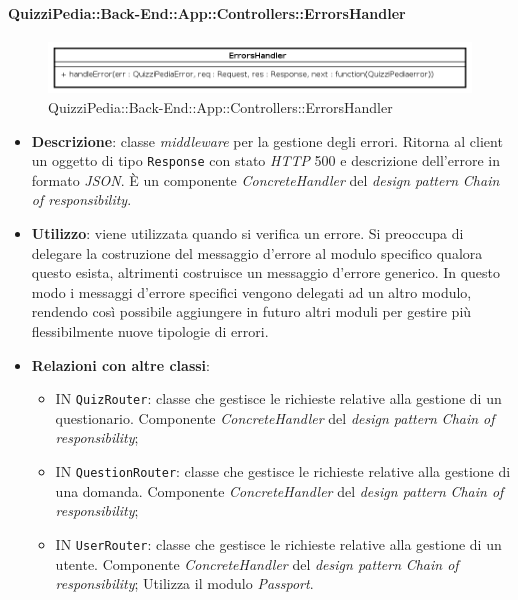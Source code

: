 \paragraph{QuizziPedia::Back-End::App::Controllers::ErrorsHandler}
\begin{figure}[ht]
	\centering
	\includegraphics[scale=0.45]{UML/Classi/Back-End/QuizziPedia_Back-End_App_Controllers_ErrorsHandler.png}
	\caption{QuizziPedia::Back-End::App::Controllers::ErrorsHandler}
\end{figure}
\FloatBarrier


\begin{itemize}
	\item \textbf{Descrizione}:
	classe \textit{middleware} per la gestione degli errori. Ritorna al client un oggetto di tipo \texttt{Response} con stato \textit{HTTP} 500 e descrizione dell'errore in formato \textit{JSON}. È un componente \textit{ConcreteHandler} del \textit{design pattern} \textit{Chain of responsibility}.
	\item \textbf{Utilizzo}:
	viene utilizzata quando si verifica un errore. Si preoccupa di delegare la costruzione del messaggio d'errore al modulo specifico qualora questo esista, altrimenti costruisce un messaggio d'errore generico. In questo modo i messaggi d'errore specifici vengono delegati ad un altro modulo, rendendo così possibile aggiungere in futuro altri moduli per gestire più flessibilmente nuove tipologie di errori.
	\item \textbf{Relazioni con altre classi}:
	\begin{itemize}
		\item IN \texttt{QuizRouter}:
		classe che gestisce le richieste relative alla gestione di un questionario. Componente \textit{ConcreteHandler} del \textit{design pattern} \textit{Chain of responsibility};
		\item IN \texttt{QuestionRouter}:
		classe che gestisce le richieste relative alla gestione di una domanda. Componente \textit{ConcreteHandler} del \textit{design pattern} \textit{Chain of responsibility};
		\item IN \texttt{UserRouter}:
		classe che gestisce le richieste relative alla gestione di un utente. Componente \textit{ConcreteHandler} del \textit{design pattern} \textit{Chain of responsibility}; Utilizza il modulo \textit{Passport}.

\end{itemize}
\end{itemize}
